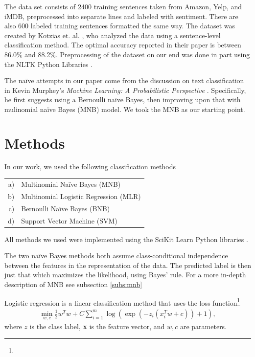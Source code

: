 \documentclass{article} %
\begin{document}
	The data set consists of 2400 training sentences taken from Amazon, Yelp, and iMDB, preprocessed into separate lines and labeled with sentiment. There are also 600 labeled training sentences formatted the same way. The dataset was created by Kotzias et. al. \cite{Kotzias2015}, who analyzed the data using a sentence-level classification method. The optimal accuracy reported in their paper is between 86.0\% and 88.2\%. Preprocessing of the dataset on our end was done in part using the NLTK Python Libraries \cite{nltk}.
	
	The na\"ive attempts in our paper come from the discussion on text classification in Kevin Murphey's \emph{Machine Learning: A Probabilistic Perspective} \cite{Murphy2012}. Specifically, he first suggests using a Bernoulli na\"ive Bayes, then improving upon that with mulinomial na\"ive Bayes (MNB) model. We took the MNB as our starting point. 
	
	
	\section{Methods}
	
	In our work, we used the following classification methods
	
	\begin{tabular}{rl}
		a) & Multinomial Na\"ive Bayes (MNB)\\
		b) & Multinomial Logistic Regression (MLR)\\
		c) & Bernoulli Na\"ive Bayes (BNB) \\
		d) & Support Vector Machine (SVM)
	\end{tabular}

	All methods we used were implemented using the SciKit Learn Python libraries \cite{scikit-learn}. 
	
	The two na\"ive Bayes methods both assume class-conditional independence between the features in the representation of the data. The predicted label is then just that which maximizes the likelihood, using Bayes' rule. For a more in-depth description of MNB see subsection \ref{subs:mnb}
	
	Logistic regression is a linear classification method that uses the loss function\footnote{}
	\begin{align}
	\min_{w,c}\frac{1}{2}w^Tw + C\sum_{i = 1}^{m}\log\left(\exp\left(-z_i\left(x_i^Tw+c\right)\right)+1\right),
	\end{align}
	where $z$ is the class label, {\bf x} is the feature vector, and $w,c$ are parameters.
	
\end{document}
